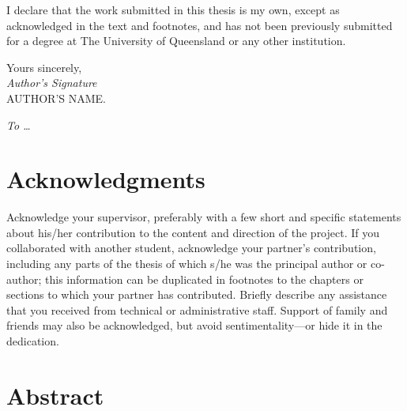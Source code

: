 \documentclass[12pt,openany,a4paper]{book}
\renewcommand{\baselinestretch}{1.2}	%
\begin{document}
I declare that the work submitted in this thesis is my own, except as
acknowledged in the text and footnotes, and has not been previously
submitted for a degree at The University of Queensland or any other
institution.

\begin{flushright}
	Yours sincerely,\\
	\medskip
	\emph{Author's Signature}\\
	\medskip
	AUTHOR'S NAME.
\end{flushright}

\cleardoublepage

\vspace*{70mm}
\begin{center}
\renewcommand{\baselinestretch}{1.0}
\sl
	To \ldots
\end{center}

\chapter{Acknowledgments}

Acknowledge your supervisor, preferably with a few short and specific
statements about his/her contribution to the content and direction of
the project.  If you collaborated with another student, acknowledge
your partner's contribution, including any parts of the thesis of
which s/he was the principal author or co-author; this information can
be duplicated in footnotes to the chapters or sections to which your
partner has contributed.  Briefly describe any assistance that you
received from technical or administrative staff.  Support of family
and friends may also be acknowledged, but avoid sentimentality---or
hide it in the dedication.

\cleardoublepage

\chapter{Abstract}

\end{document}
